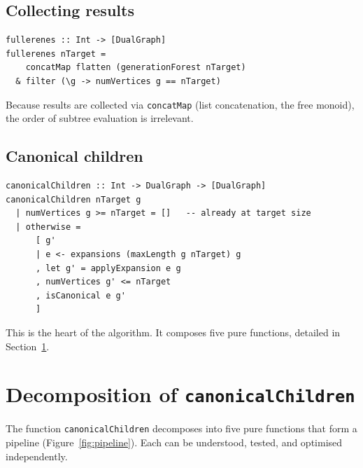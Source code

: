 \documentclass[11pt,a4paper]{article}
\theoremstyle{definition}
\begin{document}
\subsection{Collecting results}

\begin{lstlisting}
fullerenes :: Int -> [DualGraph]
fullerenes nTarget =
    concatMap flatten (generationForest nTarget)
  & filter (\g -> numVertices g == nTarget)
\end{lstlisting}

Because results are collected via \texttt{concatMap} (list
concatenation, the free monoid), the order of subtree evaluation is
irrelevant.

\subsection{Canonical children}

\begin{lstlisting}
canonicalChildren :: Int -> DualGraph -> [DualGraph]
canonicalChildren nTarget g
  | numVertices g >= nTarget = []   -- already at target size
  | otherwise =
      [ g'
      | e <- expansions (maxLength g nTarget) g
      , let g' = applyExpansion e g
      , numVertices g' <= nTarget
      , isCanonical e g'
      ]
\end{lstlisting}

This is the heart of the algorithm.  It composes five pure functions,
detailed in Section~\ref{sec:decomposition}.

\section{Decomposition of \texttt{canonicalChildren}}
\label{sec:decomposition}

The function \texttt{canonicalChildren} decomposes into five pure
functions that form a pipeline (Figure~\ref{fig:pipeline}).  Each can
be understood, tested, and optimised independently.
\end{document}
